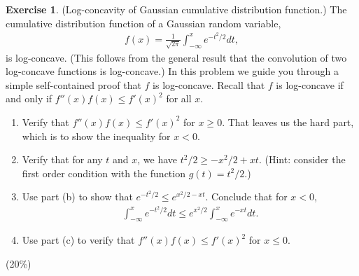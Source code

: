 \documentclass[12pt]{extarticle}
\theoremstyle{definition}
\newtheorem{exercise}{Exercise}
\begin{document}
\begin{exercise}
  (Log-concavity of Gaussian cumulative distribution function.) The cumulative distribution function of a Gaussian random variable,
  \begin{align*}
    f(x)=\frac{1}{\sqrt{2\pi}}\int_{-\infty}^xe^{-t^2/2}dt,
  \end{align*}
  is log-concave. (This follows from the general result that the convolution of two log-concave functions is log-concave.)
  In this problem we guide you through a simple self-contained proof that $f$ is log-concave.
  Recall that $f$ is log-concave if and only if $f''(x)f(x)\le f'(x)^2$ for all $x$. 
  \begin{enumerate}[label=(\alph*)]
    \item Verify that $f''(x)f(x)\le f'(x)^2$ for $x\ge 0$. That leaves us the hard part, which is to show the inequality for $x<0$. 
    \item Verify that for any $t$ and $x$, we have $t^2/2\ge -x^2/2+xt$. (Hint: consider the first order condition with the function $g(t) = t^2/2$.)
    \item Use part (b) to show that $e^{-t^2/2}\le e^{x^2/2-xt}$. Conclude that for $x<0$, 
      \begin{align*}
        \int_{-\infty}^xe^{-t^2/2}dt\le e^{x^2/2}\int_{-\infty}^xe^{-xt}dt.
      \end{align*}
    \item Use part (c) to verify that $f''(x)f(x)\le f'(x)^2$ for $x\le 0$.
  \end{enumerate}
  (20\%)
\end{exercise}
\end{document}
